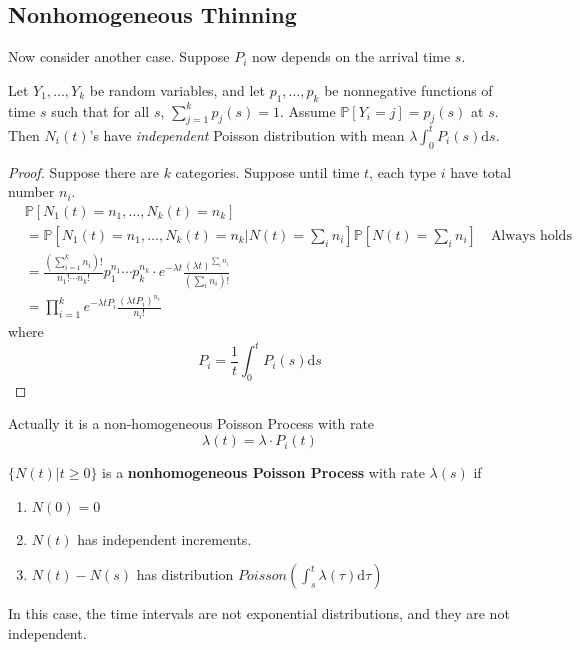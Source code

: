     \subsection{Nonhomogeneous Thinning}
        Now consider another case. Suppose $P_i$ now depends on the arrival time $s$.
        \begin{theorem}
            \label{thm:NonhomogeneousThinning}
            Let $Y_1,\dots,Y_k$ be random variables, and let $p_1,\dots,p_k$ be nonnegative functions of time $s$ such that for all $s$, $\sum_{j=1}^k p_j(s)=1$. Assume $\mathbb{P}[Y_i=j]=p_j(s)$ at $s$. Then $N_i(t)$'s have \emph{independent} Poisson distribution with mean $\lambda\int_0^t P_i(s)\mathrm{d}s$.
        \end{theorem}
        \begin{proof}
            Suppose there are $k$ categories. Suppose until time $t$, each type $i$ have total number $n_i$.
            \begin{align*}
                &\mathbb{P}[N_1(t)=n_1,\dots,N_k(t)=n_k]\\
                &=\mathbb{P}\left[ N_1(t)=n_1,\dots,N_k(t)=n_k|N(t)=\sum_i n_i \right]\mathbb{P}\left[ N(t) = \sum_i n_i \right] \quad \text{Always holds}\\
                &= \frac{\left(\sum_{i=1}^kn_i\right)!}{n_1!\cdots n_k!}p_1^{n_1}\cdots p_k^{n_k} \cdot e^{-\lambda t}\frac{(\lambda t)^{\sum_in_i}}{(\sum_i n_i)!}\\
                &= \prod_{i=1}^k e^{-\lambda t P_i} \frac{(\lambda t P_i)^{n_i}}{n_i!}
            \end{align*}
            where
            \[ P_i = \frac{1}{t}\int_0^t P_i(s)\mathrm{d}s \]
        \end{proof}
        \begin{remark}
            Actually it is a non-homogeneous Poisson Process with rate
            \[ \lambda(t) = \lambda\cdot P_i(t) \]
        \end{remark}

        \begin{definition}\label{def:NonhomogeneousPoissonProcess}
            $\{ N(t) | t \ge 0 \}$ is a \textbf{nonhomogeneous Poisson Process} with rate $\lambda(s)$ if
            \begin{enumerate}
                \item $N(0)=0$
                \item $N(t)$ has independent increments.
                \item $N(t)-N(s)$ has distribution $Poisson\left(\int_s^t \lambda(\tau)\mathrm{d}\tau\right)$
            \end{enumerate}
        \end{definition}
        \begin{remark}
            In this case, the time intervals are not exponential distributions, and they are not independent.
        \end{remark}


